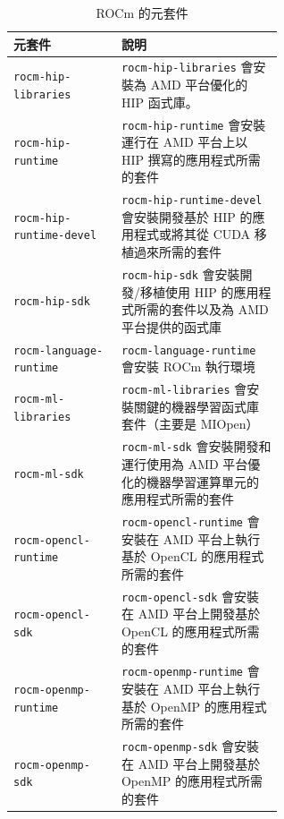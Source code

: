 \begin{table}[h!]
\centering
\caption{ROCm 的元套件}
\label{table:rocm_meta_packages}
\begin{tabular}{lp{0.6\linewidth}}
\hline
\textbf{元套件}               & \textbf{說明}  \\
\hline
\lstinline|rocm-hip-libraries|            & \lstinline|rocm-hip-libraries| 會安裝為 AMD 平台優化的 HIP 函式庫。                                            \\
\lstinline|rocm-hip-runtime|              & \lstinline|rocm-hip-runtime| 會安裝運行在 AMD 平台上以 HIP 撰寫的應用程式所需的套件            \\
\lstinline|rocm-hip-runtime-devel|        & \lstinline|rocm-hip-runtime-devel| 會安裝開發基於 HIP 的應用程式或將其從 CUDA 移植過來所需的套件   \\
\lstinline|rocm-hip-sdk|                  & \lstinline|rocm-hip-sdk| 會安裝開發/移植使用 HIP 的應用程式所需的套件以及為 AMD 平台提供的函式庫  \\
\lstinline|rocm-language-runtime|         & \lstinline|rocm-language-runtime| 會安裝 ROCm 執行環境   \\
\lstinline|rocm-ml-libraries|             & \lstinline|rocm-ml-libraries| 會安裝關鍵的機器學習函式庫套件（主要是 MIOpen）  \\
\lstinline|rocm-ml-sdk|                   & \lstinline|rocm-ml-sdk| 會安裝開發和運行使用為 AMD 平台優化的機器學習運算單元的應用程式所需的套件  \\
\lstinline|rocm-opencl-runtime|           & \lstinline|rocm-opencl-runtime| 會安裝在 AMD 平台上執行基於 OpenCL 的應用程式所需的套件   \\
\lstinline|rocm-opencl-sdk|               & \lstinline|rocm-opencl-sdk| 會安裝在 AMD 平台上開發基於 OpenCL 的應用程式所需的套件  \\
\lstinline|rocm-openmp-runtime|           & \lstinline|rocm-openmp-runtime| 會安裝在 AMD 平台上執行基於 OpenMP 的應用程式所需的套件  \\
\lstinline|rocm-openmp-sdk|               & \lstinline|rocm-openmp-sdk| 會安裝在 AMD 平台上開發基於 OpenMP 的應用程式所需的套件   \\
\hline
\end{tabular}
\end{table}
